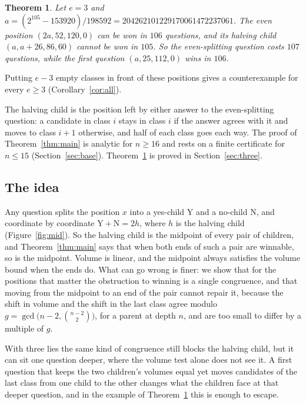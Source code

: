 \documentclass[11pt]{amsart}
\newtheorem{thm}{Theorem}[section]
\theoremstyle{definition}
\newcommand{\Y}{\mathrm{Y}}
\newcommand{\N}{\mathrm{N}}
\begin{document}
\begin{thm}\label{thm:three}
Let $e=3$ and $a=(2^{105}-153920)/198592=204262101229170061472237061$. The even position $(2a,52,120,0)$ can be won in
$106$ questions, and its halving child $(a,a+26,86,60)$ cannot be won in $105$. So the even-splitting question costs
$107$ questions, while the first question $(a,25,112,0)$ wins in $106$.
\end{thm}

\noindent Putting $e-3$ empty classes in front of these positions gives a counterexample for every $e\ge3$
(Corollary~\ref{cor:all}).

The halving child is the position left by either answer to the even-splitting question: a candidate in class $i$
stays in class $i$ if the answer agrees with it and moves to class $i+1$ otherwise, and half of each class goes each
way. The proof of Theorem~\ref{thm:main} is analytic for $n\ge16$ and rests on a finite certificate for $n\le15$
(Section~\ref{sec:base}). Theorem~\ref{thm:three} is proved in Section~\ref{sec:three}.

\subsection*{The idea}
Any question splits the position $x$ into a yes-child $\Y$ and a no-child $\N$, and coordinate by coordinate
$\Y+\N=2h$, where $h$ is the halving child (Figure~\ref{fig:mid}). So the halving child is the midpoint of every pair
of children, and Theorem~\ref{thm:main} says that when both ends of such a pair are winnable, so is the midpoint.
Volume is linear, and the midpoint always satisfies the volume bound when the ends do. What can go wrong is finer: we
show that for the positions that matter the obstruction to winning is a single congruence, and that moving from the
midpoint to an end of the pair cannot repair it, because the shift in volume and the shift in the last class agree
modulo $g=\gcd\bigl(n-2,\binom{n-2}2\bigr)$, for a parent at depth $n$, and are too small to differ by a multiple of $g$.

With three lies the same kind of congruence still blocks the halving child, but it can sit one question deeper,
where the volume test alone does not see it. A first question that keeps the two children's volumes equal yet moves
candidates of the last class from one child to the other changes what the children face at that deeper question,
and in the example of Theorem~\ref{thm:three} this is enough to escape.
\end{document}
